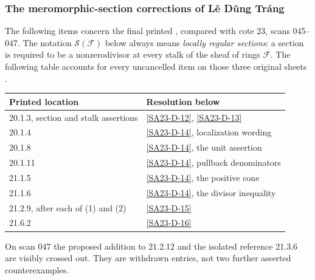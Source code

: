 \subsubsection{The meromorphic-section corrections of L\^e D\~ung Tr\'ang}

The following items concern the final printed
\cite[IV 20.1.3--20.1.11, pp.~227--230;
21.1.5--21.1.6, pp.~256--257;
21.2.9, p.~261; 21.6.2, p.~271]{algEGAIV4},
compared with cote 23, scans 045--047.  The notation
$\mathscr S(\mathcal F)$ below always means \emph{locally regular
sections}: a section is required to be a nonzerodivisor at every
stalk of the sheaf of rings $\mathcal F$.
The following table accounts for every uncancelled item on those
three original sheets \cite[scans 045--047]{algManuscript23}.
\begin{center}
\begin{tabular}{ll}
Printed location & Resolution below\\
\hline
20.1.3, section and stalk assertions & \ref{SA23-D-12}, \ref{SA23-D-13}\\
20.1.4 & \ref{SA23-D-14}, localization wording\\
20.1.8 & \ref{SA23-D-14}, the unit assertion\\
20.1.11 & \ref{SA23-D-14}, pullback denominators\\
21.1.5 & \ref{SA23-D-14}, the positive cone\\
21.1.6 & \ref{SA23-D-14}, the divisor inequality\\
21.2.9, after each of (1) and (2) & \ref{SA23-D-15}\\
21.6.2 & \ref{SA23-D-16}
\end{tabular}
\end{center}
On scan 047 the proposed addition to 21.2.12 and the isolated
reference 21.3.6 are visibly crossed out.  They are withdrawn
entries, not two further asserted counterexamples.

